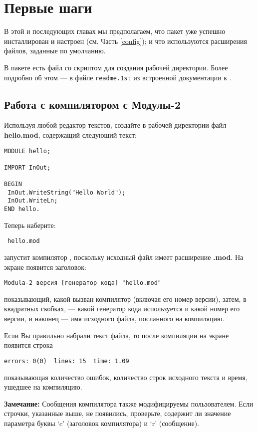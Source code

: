 
\chapter{Первые шаги}\label{start}

В этой и последующих главах мы предполагаем, что
пакет \xds{} уже успешно инсталлирован и настроен
(см. Часть \ref{config}); и что используются расширения файлов,
заданные по умолчанию.

В пакете \XDS{} есть файл  со скриптом
для создания рабочей директории.
Более подробно об этом --- в файле {\tt readme.1st}
из встроенной документации к \XDS{}.

\section{Работа с компилятором с Модулы-2}

Используя любой редактор текстов, создайте в рабочей директории
файл {\bf hello.mod}, содержащий следующий текст:

\begin{verbatim}
MODULE hello;

IMPORT InOut;

BEGIN
 InOut.WriteString("Hello World");
 InOut.WriteLn;
END hello.
\end{verbatim}

Теперь наберите:
\begin{flushleft} \tt
        \XC{} hello.mod
\end{flushleft}
\xc{} запустит компилятор  \mt{}, поскольку исходный файл имеет 
расширение {\bf.mod}. На экране появится заголовок:
\begin{verbatim}
Modula-2 версия [генератор кода] "hello.mod"
\end{verbatim}
показывающий, какой вызван компилятор (включая его номер версии),
затем, в квадратных скобках, --- какой генератор кода используется 
и какой номер его версии, и наконец --- имя исходного файла, посланного на 
компиляцию.

Если Вы правильно набрали текст файла, то после компиляции
на экране появится строка
\begin{verbatim}
errors: 0(0)  lines: 15  time: 1.09
\end{verbatim}
показывающая количество ошибок, количество строк исходного текста
и время, ушедшее на компиляцию.

{\bf Замечание:} Сообщения компилятора \XDS{} также модифицируемы
пользователем. Если строчки, указанные выше, не появились, проверьте,
содержит ли значение параметра 
буквы `c' (заголовок компилятора) и `r' (сообщение).

